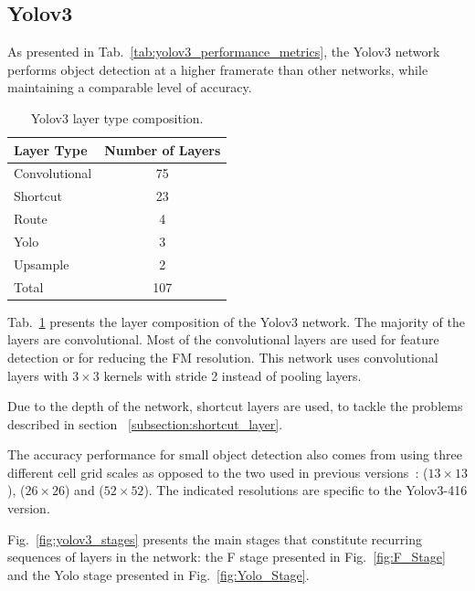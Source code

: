 \subsection{Yolov3}
\label{sec:yolov3}
As presented in Tab.~\ref{tab:yolov3_performance_metrics}, the Yolov3 network
performs object detection at a higher framerate than other networks, while
maintaining a comparable level of accuracy.

\begin{table}[!htb]
	\renewcommand{\arraystretch}{1.2} %
	\centering
	\begin{tabular}{lc}
		\toprule
		Layer Type           & Number of Layers  \\
		\midrule
		Convolutional       & 75    \\
		Shortcut  			& 23     \\
		Route 			    & 4     \\
		Yolo  				& 3     \\
		Upsample 		    & 2     \\
		Total 				& 107 \\
		\bottomrule
	\end{tabular}
	\caption[Table caption shown in TOC.]{Yolov3 layer type composition.}
	\label{tab:yolov3_num_layers}
\end{table}
Tab.~\ref{tab:yolov3_num_layers} presents the layer composition of the Yolov3
network. The majority of the layers are convolutional. Most of the convolutional
layers are used for feature detection or for reducing the FM resolution. This network
uses convolutional layers with $3\times3$ kernels with stride 2 instead of
pooling layers.

Due to the depth of the network, shortcut layers are used, to tackle the
problems described in section ~\ref{subsection:shortcut_layer}.

The accuracy performance for small object detection also comes from using three
different cell grid scales as opposed to the two used in previous
versions~\cite{Yolov2_redmon2016yolo9000}: ($13\times13$), ($26\times26$) and
($52\times52$). The indicated resolutions are specific to the Yolov3-416
version.

Fig.~\ref{fig:yolov3_stages} presents the main stages that constitute recurring
sequences of layers in the network: the F stage presented in
Fig.~\ref{fig:F_Stage} and the Yolo stage presented in
Fig.~\ref{fig:Yolo_Stage}.

